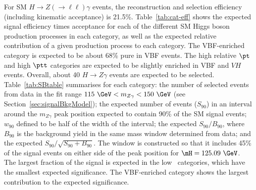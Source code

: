 For SM $H\to Z(\to\ell\ell)\gamma$ events, the reconstruction and selection efficiency (including
kinematic acceptance) is  21.5\%.
Table~\ref{tab:cat-eff} shows the expected signal efficiency times acceptance for each of the different SM
Higgs boson production processes in each category, as well as the expected relative contribution of
a given production process to each category.
The VBF-enriched category is expected to be about 68\% pure in VBF events. The high relative 
$\pt$
and high $\ptt$ categories are expected to be slightly enriched in VBF and $VH$ events. Overall,
about 40 $H\to Z\gamma$ events are expected to be selected.
Table~\ref{tab:SBtable} summarises for each category: 
the number of selected events from data in the fit range $115~\GeV < m_{Z\gamma} < 150~\GeV$
(see Section~\ref{sec:signalBkgModel}); 
the expected number of events ($S_{90}$) in an interval around the $m_{Z\gamma}$ peak position 
expected to 
contain 90\%  of the SM signal events;
$w_{90}$ defined to be half of the width of the interval; 
the expected $S_{90}/B_{90}$, where $B_{90}$ is the background yield in the same mass window determined from data;
and the expected $S_{90}/\sqrt{S_{90}+B_{90}}$.
The window is constructed so that it includes 45\% of the signal events on either side of the peak position
for $\mH=125.09~\GeV$. The largest fraction of the signal is expected in the low \ptt\ 
categories, which have the smallest expected significance. The VBF-enriched category shows
the largest contribution to the expected significance.



